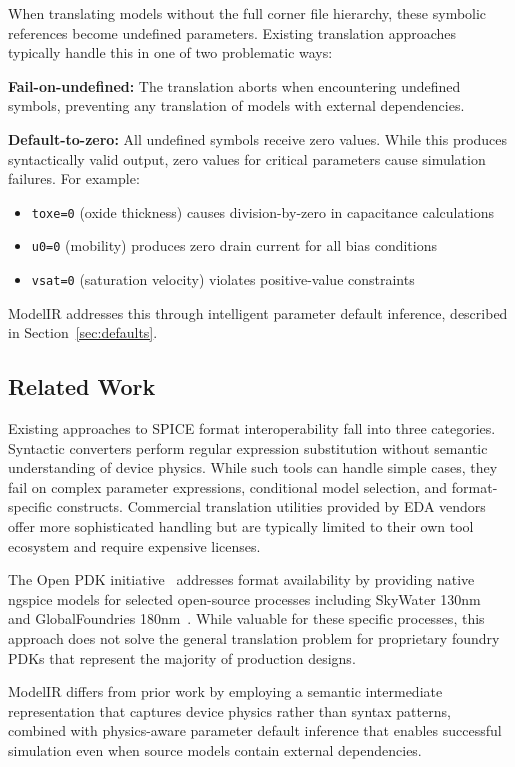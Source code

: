 \documentclass[conference]{IEEEtran}
\begin{document}
When translating models without the full corner file hierarchy, these symbolic references become undefined parameters. Existing translation approaches typically handle this in one of two problematic ways:

\textbf{Fail-on-undefined:} The translation aborts when encountering undefined symbols, preventing any translation of models with external dependencies.

\textbf{Default-to-zero:} All undefined symbols receive zero values. While this produces syntactically valid output, zero values for critical parameters cause simulation failures. For example:
\begin{itemize}
\item \texttt{toxe=0} (oxide thickness) causes division-by-zero in capacitance calculations
\item \texttt{u0=0} (mobility) produces zero drain current for all bias conditions  
\item \texttt{vsat=0} (saturation velocity) violates positive-value constraints
\end{itemize}

ModelIR addresses this through intelligent parameter default inference, described in Section~\ref{sec:defaults}.

\subsection{Related Work}

Existing approaches to SPICE format interoperability fall into three categories. Syntactic converters perform regular expression substitution without semantic understanding of device physics. While such tools can handle simple cases, they fail on complex parameter expressions, conditional model selection, and format-specific constructs. Commercial translation utilities provided by EDA vendors offer more sophisticated handling but are typically limited to their own tool ecosystem and require expensive licenses.

The Open PDK initiative~\cite{openpdk} addresses format availability by providing native ngspice models for selected open-source processes including SkyWater 130nm~\cite{skywater} and GlobalFoundries 180nm~\cite{gf180}. While valuable for these specific processes, this approach does not solve the general translation problem for proprietary foundry PDKs that represent the majority of production designs.

ModelIR differs from prior work by employing a semantic intermediate representation that captures device physics rather than syntax patterns, combined with physics-aware parameter default inference that enables successful simulation even when source models contain external dependencies.
\end{document}
